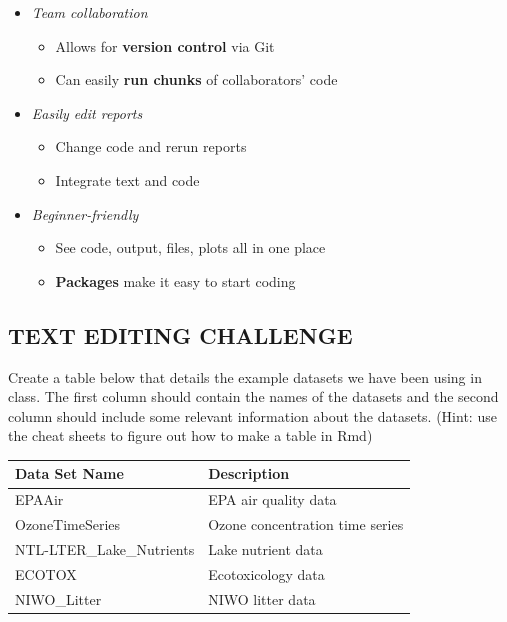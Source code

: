 \documentclass[
]{article}
\providecommand{\tightlist}{%
  \setlength{\itemsep}{0pt}\setlength{\parskip}{0pt}}
\begin{document}
\begin{itemize}
\tightlist
\item
  \emph{Team collaboration}

  \begin{itemize}
  \tightlist
  \item
    Allows for \textbf{version control} via Git
  \item
    Can easily \textbf{run chunks} of collaborators' code
  \end{itemize}
\item
  \emph{Easily edit reports}

  \begin{itemize}
  \tightlist
  \item
    Change code and rerun reports
  \item
    Integrate text and code
  \end{itemize}
\item
  \emph{Beginner-friendly}

  \begin{itemize}
  \tightlist
  \item
    See code, output, files, plots all in one place
  \item
    \textbf{Packages} make it easy to start coding
  \end{itemize}
\end{itemize}

\hypertarget{text-editing-challenge}{%
\subsection{TEXT EDITING CHALLENGE}\label{text-editing-challenge}}

Create a table below that details the example datasets we have been
using in class. The first column should contain the names of the
datasets and the second column should include some relevant information
about the datasets. (Hint: use the cheat sheets to figure out how to
make a table in Rmd)

\begin{longtable}[]{@{}ll@{}}
\toprule
Data Set Name & Description \\
\midrule
\endhead
EPAAir & EPA air quality data \\
OzoneTimeSeries & Ozone concentration time series \\
NTL-LTER\_Lake\_Nutrients & Lake nutrient data \\
ECOTOX & Ecotoxicology data \\
NIWO\_Litter & NIWO litter data \\
\bottomrule
\end{longtable}
\end{document}
